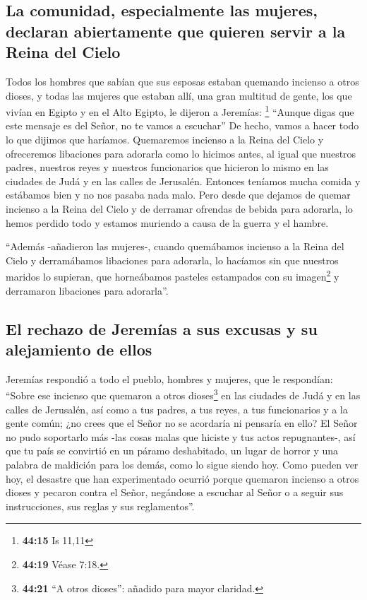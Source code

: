 \hypertarget{la-comunidad-especialmente-las-mujeres-declaran-abiertamente-que-quieren-servir-a-la-reina-del-cielo}{%
\subsection{La comunidad, especialmente las mujeres, declaran
abiertamente que quieren servir a la Reina del
Cielo}\label{la-comunidad-especialmente-las-mujeres-declaran-abiertamente-que-quieren-servir-a-la-reina-del-cielo}}

 Todos los hombres que sabían que sus esposas estaban
quemando incienso a otros dioses, y todas las mujeres que estaban allí,
una gran multitud de gente, los que vivían en Egipto y en el Alto
Egipto, le dijeron a Jeremías: \footnote{\textbf{44:15} Is 11,11}
 ``Aunque digas que este mensaje es del Señor, no te
vamos a escuchar''  De hecho, vamos a hacer todo lo que
dijimos que haríamos. Quemaremos incienso a la Reina del Cielo y
ofreceremos libaciones para adorarla como lo hicimos antes, al igual que
nuestros padres, nuestros reyes y nuestros funcionarios que hicieron lo
mismo en las ciudades de Judá y en las calles de Jerusalén. Entonces
teníamos mucha comida y estábamos bien y no nos pasaba nada malo.
 Pero desde que dejamos de quemar incienso a la Reina del
Cielo y de derramar ofrendas de bebida para adorarla, lo hemos perdido
todo y estamos muriendo a causa de la guerra y el hambre.

 ``Además -añadieron las mujeres-, cuando quemábamos
incienso a la Reina del Cielo y derramábamos libaciones para adorarla,
lo hacíamos sin que nuestros maridos lo supieran, que horneábamos
pasteles estampados con su imagen\footnote{\textbf{44:19} Véase 7:18.} y
derramaron libaciones para adorarla''.

\hypertarget{el-rechazo-de-jeremuxedas-a-sus-excusas-y-su-alejamiento-de-ellos}{%
\subsection{El rechazo de Jeremías a sus excusas y su alejamiento de
ellos}\label{el-rechazo-de-jeremuxedas-a-sus-excusas-y-su-alejamiento-de-ellos}}

 Jeremías respondió a todo el pueblo, hombres y mujeres,
que le respondían:  ``Sobre ese incienso que quemaron a
otros dioses\footnote{\textbf{44:21} ``A otros dioses'': añadido para
  mayor claridad.} en las ciudades de Judá y en las calles de Jerusalén,
así como a tus padres, a tus reyes, a tus funcionarios y a la gente
común; ¿no crees que el Señor no se acordaría ni pensaría en ello?
 El Señor no pudo soportarlo más -las cosas malas que
hiciste y tus actos repugnantes-, así que tu país se convirtió en un
páramo deshabitado, un lugar de horror y una palabra de maldición para
los demás, como lo sigue siendo hoy.  Como pueden ver
hoy, el desastre que han experimentado ocurrió porque quemaron incienso
a otros dioses y pecaron contra el Señor, negándose a escuchar al Señor
o a seguir sus instrucciones, sus reglas y sus reglamentos''.

